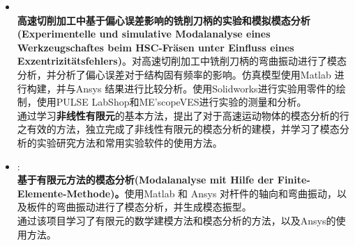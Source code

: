 \documentclass[zh]{resume}
\begin{document}
\begin{itemize}
	
	\item 
	\\
	\textbf{高速切削加工中基于偏心误差影响的铣削刀柄的实验和模拟模态分析(Experimentelle und simulative Modalanalyse eines Werkzeugs\-chaftes beim HSC-Fräsen unter Einfluss eines Exzentrizitätsfehlers)}。对高速切削加工中铣削刀柄的弯曲振动进行了模态分析，并分析了偏心误差对于结构固有频率的影响。仿真模型使用Matlab 进行构建，并与Ansys 结果进行比较分析。使用Solidworks进行实验用零件的绘制，使用PULSE LabShop和ME'scopeVES进行实验的测量和分析。\\
	通过学习\textbf{非线性有限元}的基本方法，提出了对于高速运动物体的模态分析的行之有效的方法，独立完成了非线性有限元的模态分析的建模，并学习了模态分析的实验研究方法和常用实验软件的使用方法。
	
	\item 
	: %
	\\
	\textbf{基于有限元方法的模态分析(Modalanalyse mit Hilfe der Finite-Elemente-Methode)。}使用Matlab 和 Ansys 对杆件的轴向和弯曲振动，以及板件的弯曲振动进行了模态分析，并生成模态振型。\\
	通过该项目学习了有限元的数学建模方法和模态分析的方法，以及Ansys的使用方法。
	

\end{itemize}
\end{document}
